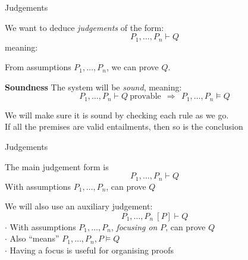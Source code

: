 \documentclass[xetex,aspectratio=169,14pt,hyperref={pdfpagelabels=true,pdflang={en-GB}}]{beamer}
\begin{document}
\frame{\titlepage}


\begin{frame}[t]
  {Judgements}

  We want to deduce \emph{judgements} of the form:
  \begin{displaymath}
    P_1, \dots, P_n \vdash Q
  \end{displaymath}
  meaning:
  \begin{center}
    From assumptions $P_1, \dots, P_n$, we can prove $Q$.
  \end{center}

  \bigskip

  {\bf Soundness}
  The system will be \emph{sound}, meaning:
  \begin{displaymath}
    P_1,\dots,P_n \vdash Q~\textrm{provable}~~\Rightarrow~~P_1, \dots, P_n \models Q
  \end{displaymath}

  We will make sure it is sound by checking each rule as we go. \\
  \quad \textcolor{black!60}{If all the premises are valid entailments, then so is the conclusion}
\end{frame}

\begin{frame}[t]
  {Judgements}

  The main judgement form is
  \begin{displaymath}
    P_1, \dots, P_n \vdash Q
  \end{displaymath}
  \qquad \textcolor{black!60}{With assumptions $P_1,\dots,P_n$, can prove $Q$}

  \pause
  \bigskip

  We will also use an auxiliary judgement:
  \begin{displaymath}
    P_1, \dots, P_n~[P] \vdash Q
  \end{displaymath}
  \quad \textcolor{black!60}{$\cdot$ With assumptions $P_1,\dots,P_n$, \emph{focusing on} $P$, can prove $Q$}\\
  \quad \textcolor{black!60}{$\cdot$ Also ``means'' $P_1,\dots,P_n,P \models Q$}\\
  \quad \textcolor{black!60}{$\cdot$ Having a focus is useful for organising proofs}
\end{frame}
\end{document}
